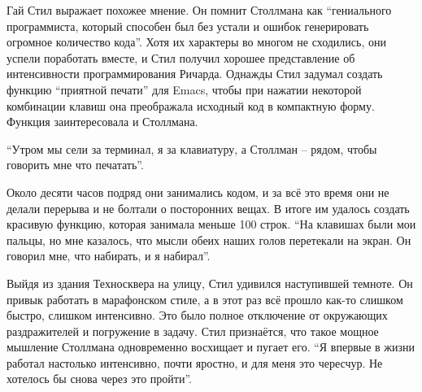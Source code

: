 Гай Стил выражает похожее мнение. Он помнит Столлмана как \enquote{гениального программиста, который способен был без устали и ошибок генерировать огромное количество кода}. Хотя их характеры во многом не сходились, они успели поработать вместе, и Стил получил хорошее представление об интенсивности программирования Ричарда. Однажды Стил задумал создать функцию \enquote{приятной печати} для Emacs, чтобы при нажатии некоторой комбинации клавиш она преображала исходный код в компактную форму. Функция заинтересовала и Столлмана.

\enquote{Утром мы сели за терминал, я за клавиатуру, а Столлман -- рядом, чтобы говорить мне что печатать}.

Около десяти часов подряд они занимались кодом, и за всё это время они не делали перерыва и не болтали о посторонних вещах. В итоге им удалось создать красивую функцию, которая занимала меньше 100 строк. \enquote{На клавишах были мои пальцы, но мне казалось, что мысли обеих наших голов перетекали на экран. Он говорил мне, что набирать, и я набирал}.

Выйдя из здания Техносквера на улицу, Стил удивился наступившей темноте. Он привык работать в марафонском стиле, а в этот раз всё прошло как-то слишком быстро, слишком интенсивно. Это было полное отключение от окружающих раздражителей и погружение в задачу. Стил признаётся, что такое мощное мышление Столлмана одновременно восхищает и пугает его. \enquote{Я впервые в жизни работал настолько интенсивно, почти яростно, и для меня это чересчур. Не хотелось бы снова через это пройти}.

\theendnotes
\setcounter{endnote}{0}
